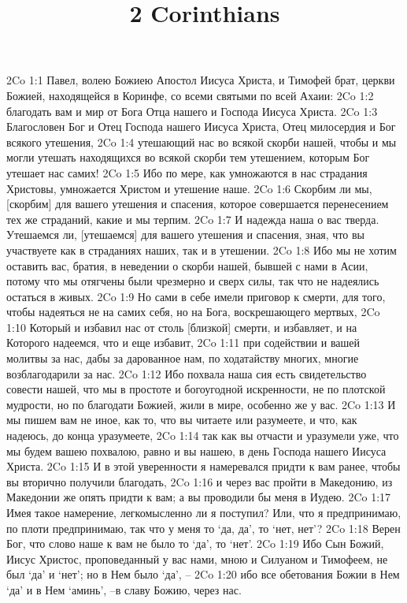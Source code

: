 

\title{2 Corinthians}

2Co 1:1  Павел, волею Божиею Апостол Иисуса Христа, и Тимофей брат, церкви Божией, находящейся в Коринфе, со всеми святыми по всей Ахаии:
2Co 1:2  благодать вам и мир от Бога Отца нашего и Господа Иисуса Христа.
2Co 1:3  Благословен Бог и Отец Господа нашего Иисуса Христа, Отец милосердия и Бог всякого утешения,
2Co 1:4  утешающий нас во всякой скорби нашей, чтобы и мы могли утешать находящихся во всякой скорби тем утешением, которым Бог утешает нас самих!
2Co 1:5  Ибо по мере, как умножаются в нас страдания Христовы, умножается Христом и утешение наше.
2Co 1:6  Скорбим ли мы, [скорбим] для вашего утешения и спасения, которое совершается перенесением тех же страданий, какие и мы терпим.
2Co 1:7  И надежда наша о вас тверда. Утешаемся ли, [утешаемся] для вашего утешения и спасения, зная, что вы участвуете как в страданиях наших, так и в утешении.
2Co 1:8  Ибо мы не хотим оставить вас, братия, в неведении о скорби нашей, бывшей с нами в Асии, потому что мы отягчены были чрезмерно и сверх силы, так что не надеялись остаться в живых.
2Co 1:9  Но сами в себе имели приговор к смерти, для того, чтобы надеяться не на самих себя, но на Бога, воскрешающего мертвых,
2Co 1:10  Который и избавил нас от столь [близкой] смерти, и избавляет, и на Которого надеемся, что и еще избавит,
2Co 1:11  при содействии и вашей молитвы за нас, дабы за дарованное нам, по ходатайству многих, многие возблагодарили за нас.
2Co 1:12  Ибо похвала наша сия есть свидетельство совести нашей, что мы в простоте и богоугодной искренности, не по плотской мудрости, но по благодати Божией, жили в мире, особенно же у вас.
2Co 1:13  И мы пишем вам не иное, как то, что вы читаете или разумеете, и что, как надеюсь, до конца уразумеете,
2Co 1:14  так как вы отчасти и уразумели уже, что мы будем вашею похвалою, равно и вы нашею, в день Господа нашего Иисуса Христа.
2Co 1:15  И в этой уверенности я намеревался придти к вам ранее, чтобы вы вторично получили благодать,
2Co 1:16  и через вас пройти в Македонию, из Македонии же опять придти к вам; а вы проводили бы меня в Иудею.
2Co 1:17  Имея такое намерение, легкомысленно ли я поступил? Или, что я предпринимаю, по плоти предпринимаю, так что у меня то `да, да', то `нет, нет'?
2Co 1:18  Верен Бог, что слово наше к вам не было то `да', то `нет'.
2Co 1:19  Ибо Сын Божий, Иисус Христос, проповеданный у вас нами, мною и Силуаном и Тимофеем, не был `да' и `нет'; но в Нем было `да', --
2Co 1:20  ибо все обетования Божии в Нем `да' и в Нем `аминь', --в славу Божию, через нас.
